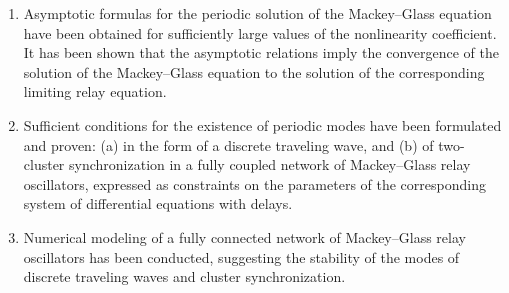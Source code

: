 
\begin{enumerate}
  \item Asymptotic formulas for the periodic solution of the Mackey--Glass equation have been obtained for sufficiently large values of the nonlinearity coefficient. It has been shown that the asymptotic relations imply the convergence of the solution of the Mackey--Glass equation to the solution of the corresponding limiting relay equation.
  \item Sufficient conditions for the existence of periodic modes have been formulated and proven: (a) in the form of a discrete traveling wave, and (b) of two-cluster synchronization in a fully coupled network of Mackey--Glass relay oscillators, expressed as constraints on the parameters of the corresponding system of differential equations with delays.
  \item Numerical modeling of a fully connected network of Mackey--Glass relay oscillators has been conducted, suggesting the stability of the modes of discrete traveling waves and cluster synchronization.
\end{enumerate}
